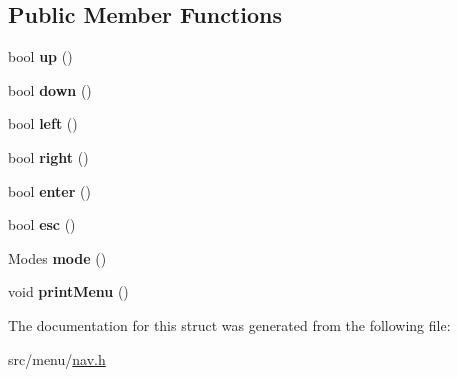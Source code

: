 \subsection*{Public Member Functions}
\begin{DoxyCompactItemize}
\item 
\mbox{\label{structNavRoot_a9561689a3b3e22e2bd2b7d2e81d4f60e}} 
bool {\bfseries up} ()
\item 
\mbox{\label{structNavRoot_a49465832033d1ca3d67d4185cd5064d0}} 
bool {\bfseries down} ()
\item 
\mbox{\label{structNavRoot_a030d817943c956afa8f1465b8f085d0d}} 
bool {\bfseries left} ()
\item 
\mbox{\label{structNavRoot_abdf3abf63db594400824b56a9eed2c03}} 
bool {\bfseries right} ()
\item 
\mbox{\label{structNavRoot_a3e808af28e2f4d43710309e20a4ca3ee}} 
bool {\bfseries enter} ()
\item 
\mbox{\label{structNavRoot_a1c713f594a04d9159dd317bbb8c76e43}} 
bool {\bfseries esc} ()
\item 
\mbox{\label{structNavRoot_aad1657e2e5ae406e5dfe9602bdbc3bb4}} 
Modes {\bfseries mode} ()
\item 
\mbox{\label{structNavRoot_ad684ebca9af961c99cb1cbfe32c5ee4a}} 
void {\bfseries print\+Menu} ()
\end{DoxyCompactItemize}


The documentation for this struct was generated from the following file\+:\begin{DoxyCompactItemize}
\item 
src/menu/\hyperlink{nav_8h}{nav.\+h}\end{DoxyCompactItemize}
